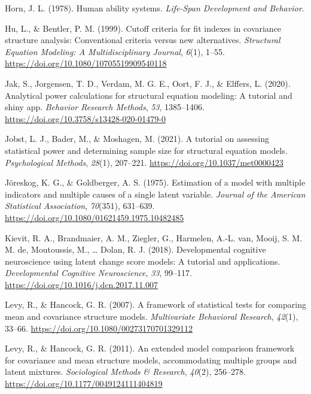 \documentclass[
  man,floatsintext]{apa6}
\newlength{\cslhangindent}
\newlength{\cslentryspacingunit} %
\newenvironment{CSLReferences}[2] %
 {%
  \setlength{\parindent}{0pt}
  \ifodd #1
  \let\oldpar\par
  \def\par{\hangindent=\cslhangindent\oldpar}
  \fi
  \setlength{\parskip}{#2\cslentryspacingunit}
 }%
 {}
\begin{document}
\begin{CSLReferences}{1}{0}
\leavevmode{}%
Horn, J. L. (1978). Human ability systems. \emph{Life-Span Development and Behavior}.

\leavevmode{}%
Hu, L., \& Bentler, P. M. (1999). Cutoff criteria for fit indexes in covariance structure analysis: Conventional criteria versus new alternatives. \emph{Structural Equation Modeling: A Multidisciplinary Journal}, \emph{6}(1), 1--55. \url{https://doi.org/10.1080/10705519909540118}

\leavevmode{}%
Jak, S., Jorgensen, T. D., Verdam, M. G. E., Oort, F. J., \& Elffers, L. (2020). Analytical power calculations for structural equation modeling: A tutorial and shiny app. \emph{Behavior Research Methods}, \emph{53}, 1385--1406. \url{https://doi.org/10.3758/s13428-020-01479-0}

\leavevmode{}%
Jobst, L. J., Bader, M., \& Moshagen, M. (2021). A tutorial on assessing statistical power and determining sample size for structural equation models. \emph{Psychological Methods}, \emph{28}(1), 207--221. \url{https://doi.org/10.1037/met0000423}

\leavevmode{}%
Jöreskog, K. G., \& Goldberger, A. S. (1975). Estimation of a model with multiple indicators and multiple causes of a single latent variable. \emph{Journal of the American Statistical Association}, \emph{70}(351), 631--639. \url{https://doi.org/10.1080/01621459.1975.10482485}

\leavevmode{}%
Kievit, R. A., Brandmaier, A. M., Ziegler, G., Harmelen, A.-L. van, Mooij, S. M. M. de, Moutoussis, M., \ldots{} Dolan, R. J. (2018). Developmental cognitive neuroscience using latent change score models: A tutorial and applications. \emph{Developmental Cognitive Neuroscience}, \emph{33}, 99--117. \url{https://doi.org/10.1016/j.dcn.2017.11.007}

\leavevmode{}%
Levy, R., \& Hancock, G. R. (2007). A framework of statistical tests for comparing mean and covariance structure models. \emph{Multivariate Behavioral Research}, \emph{42}(1), 33--66. \url{https://doi.org/10.1080/00273170701329112}

\leavevmode{}%
Levy, R., \& Hancock, G. R. (2011). An extended model comparison framework for covariance and mean structure models, accommodating multiple groups and latent mixtures. \emph{Sociological Methods \& Research}, \emph{40}(2), 256--278. \url{https://doi.org/10.1177/0049124111404819}


\end{CSLReferences}
\end{document}
